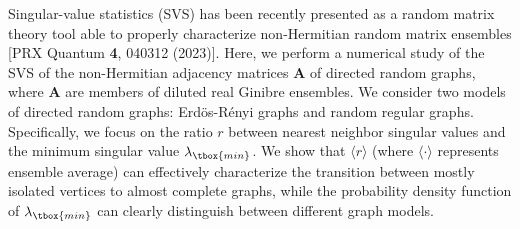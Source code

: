 Singular-value statistics (SVS) has been recently presented as a random matrix theory
tool able to properly characterize non-Hermitian random matrix ensembles [PRX Quantum {\bf 4}, 040312 (2023)].
Here, we perform a numerical study of the SVS of the non-Hermitian adjacency matrices
$\mathbf{A}$ of directed random graphs, where $\mathbf{A}$ are members of diluted real 
Ginibre ensembles. 
We consider two models of directed random graphs: Erd\"os-R\'enyi graphs and random regular graphs.
Specifically, we focus on the ratio $r$ between nearest neighbor singular values 
and the minimum singular value $\lambda_{\tbox{min}}$.
We show that $\langle r \rangle$ (where $\langle \cdot \rangle$ represents ensemble average) 
can effectively characterize the transition between mostly 
isolated vertices to almost complete graphs, while the probability density function of $\lambda_{\tbox{min}}$ 
can clearly distinguish between different graph models.